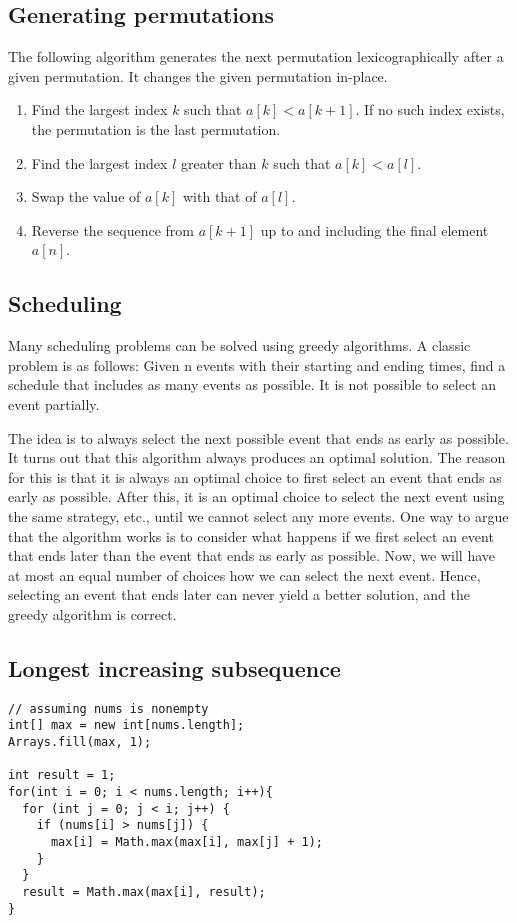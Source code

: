 \documentclass[a4paper]{article}
\begin{document}
\subsection{Generating permutations}
The following algorithm generates the next permutation lexicographically after a given permutation. It changes the given permutation in-place.
\begin{enumerate}
  \item Find the largest index $k$ such that $a[k] < a[k + 1]$. If no such index exists, the permutation is the last permutation.
  \item Find the largest index $l$ greater than $k$ such that $a[k] < a[l]$.
  \item Swap the value of $a[k]$ with that of $a[l]$.
  \item Reverse the sequence from $a[k + 1]$ up to and including the final element $a[n]$.
\end{enumerate}


\subsection{Scheduling}
Many scheduling problems can be solved using greedy algorithms. A classic problem is as follows: Given n events with their starting and ending times, find a schedule that includes as many events as possible. It is not possible to select an event partially.

The idea is to always select the next possible event that ends as early as possible. It turns out that this algorithm always produces an optimal solution. The reason for this is that it is always an optimal choice to first select an event that ends as early as possible. After this, it is an optimal choice to select the next event using the same strategy, etc., until we cannot select any more events. One way to argue that the algorithm works is to consider what happens if we first select an event that ends later than the event that ends as early as possible. Now, we will have at most an equal number of choices how we can select the next event. Hence, selecting an event that ends later can never yield a better solution, and the greedy algorithm is correct.


\subsection{Longest increasing subsequence}
\begin{lstlisting}
// assuming nums is nonempty
int[] max = new int[nums.length];
Arrays.fill(max, 1);

int result = 1;
for(int i = 0; i < nums.length; i++){
  for (int j = 0; j < i; j++) {
    if (nums[i] > nums[j]) {
      max[i] = Math.max(max[i], max[j] + 1);
    }
  }
  result = Math.max(max[i], result);
}
\end{lstlisting}
\end{document}
